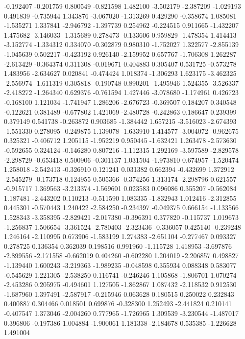-0.192407
-0.201759
0.800549
-0.821598
1.482100
-3.502179
-2.387209
-1.029193
0.491839
-0.735944
1.343876
-3.067020
-1.313269
0.429290
-0.358674
1.085081
-1.535271
1.337841
-2.946792
-1.397739
0.254962
-0.224515
0.911665
-1.432207
1.475682
-3.146033
-1.315689
0.278473
-0.133606
0.959829
-1.478354
1.414413
-3.152774
-1.334312
0.334070
-0.302879
0.980310
-1.752027
1.322577
-2.855139
-1.045639
0.502217
-0.423192
0.926140
-2.159952
0.657767
-1.706308
1.262287
-2.613429
-0.364374
0.311308
-0.019671
0.404883
0.305407
0.531725
-0.573278
1.483956
-2.634627
0.020841
-0.474424
1.018374
-1.306293
1.623175
-3.462325
-2.556974
-1.611319
0.305818
-0.190748
0.890201
-1.495946
1.524355
-3.526337
-2.418272
-1.264340
0.629376
-0.761594
1.427446
-3.078680
-1.174961
0.426723
-0.168100
1.121034
-1.741947
1.286206
-2.676723
-0.369507
0.184207
0.340548
-0.122621
0.381489
-0.677802
1.421069
-2.480728
-0.242863
0.186647
0.239399
0.379149
0.541738
-0.263872
0.903685
-1.384442
1.657215
-3.516023
-2.674393
-1.551330
0.278095
-0.249875
1.139078
-1.633910
1.414577
-3.004072
-0.962675
0.325321
-0.406712
1.205115
-1.952219
0.950445
-1.632421
1.263478
-2.573630
-0.592655
0.324124
-0.146280
0.807216
-1.112315
1.292169
-3.597589
-2.829578
-2.298729
-0.653418
0.500906
-0.301137
1.031504
-1.973810
0.674957
-1.520474
1.258018
-2.542413
-0.326910
0.121241
0.031382
0.662394
-0.432699
1.372912
-2.545279
-0.173718
0.124955
0.505366
-0.374256
1.313174
-2.298796
0.621557
-0.915717
1.369563
-3.213374
-1.569601
0.023583
0.096086
0.355207
-0.562084
1.187481
-2.443202
0.110213
-0.511590
1.083335
-1.832943
1.012416
-2.312855
0.445301
-0.570443
1.240422
-2.584250
-0.234397
-0.049375
0.666154
-1.133566
1.528343
-3.358395
-2.829421
-2.017380
-0.396391
0.377820
-0.115737
1.019673
-1.256837
1.506654
-3.361524
-2.780403
-2.323436
-0.336057
0.425140
-0.239248
1.246164
-2.110995
0.673906
-1.583199
1.274383
-2.651104
-0.277467
0.093327
0.278725
0.136354
0.362039
0.198516
0.991960
-1.115728
1.418953
-3.697876
-2.899556
-2.171558
-0.662019
0.404260
-0.602280
1.204019
-2.206857
0.498827
-1.139440
1.600243
-3.219363
-1.989235
-0.048598
0.355934
0.088348
0.583077
-0.545629
1.221305
-2.538250
0.116741
-0.246246
1.105868
-1.806701
1.070274
-2.453286
0.205975
-0.494601
1.127505
-1.862867
1.087432
-2.118532
0.912530
-1.687960
1.397491
-2.587917
-0.215946
0.063628
0.180515
0.250022
0.232843
0.400887
0.304466
0.018501
0.699876
-0.328300
1.252493
-2.441824
0.210141
-0.407547
1.373046
-2.004260
0.777965
-1.726965
1.309539
-3.230544
-1.487017
0.396806
-0.197386
1.004884
-1.900061
1.181338
-2.184678
0.535385
-1.226628
1.491004

